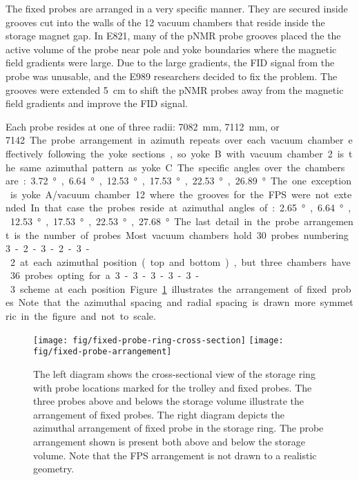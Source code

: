 The fixed probes are arranged in a very specific manner.  They are secured inside grooves cut into the walls of the 12 vacuum chambers that reside inside the storage magnet gap.  In E821, many of the pNMR probe grooves placed the the active volume of the probe near pole and yoke boundaries where the magnetic field gradients were large.  Due to the large gradients, the FID signal from the probe was unusable, and the E989 researchers decided to fix the problem.  The grooves were extended \SI{5}{\cm} to shift the pNMR probes away from the magnetic field gradients and improve the FID signal.

Each probe resides at one of three radii: \SI{7082}{\mm}, \SI{7112}{\mm}, or \SI{7142}. The probe arrangement in azimuth repeats over each vacuum chamber effectively following the yoke sections, so yoke B with vacuum chamber 2 is the same azimuthal pattern as yoke C.  The specific angles over the chambers are: \SI{3.72}{\degree}, \SI{6.64}{\degree}, \SI{12.53}{\degree}, \SI{17.53}{\degree}, \SI{22.53}{\degree}, \SI{26.89}{\degree}.  The one exception is yoke A/vacuum chamber 12 where the grooves for the FPS were not extended.  In that case the probes reside at azimuthal angles of: \SI{2.65}{\degree}, \SI{6.64}{\degree}, \SI{12.53}{\degree}, \SI{17.53}{\degree}, \SI{22.53}{\degree}, \SI{27.68}{\degree}.  The last detail in the probe arrangement is the number of probes.  Most vacuum chambers hold 30 probes numbering 3-2-3-2-3-2 at each azimuthal position (top and bottom), but three chambers have 36 probes opting for a 3-3-3-3-3-3 scheme at each position.  Figure \ref{fig:fixed-probe-arrangement} illustrates the arrangement of fixed probes.  Note that the azimuthal spacing and radial spacing is drawn more symmetric in the figure and not to scale.

\begin{figure}
\centering
\texttt{[image: fig/fixed-probe-ring-cross-section]}
\texttt{[image: fig/fixed-probe-arrangement]}
\caption{
    The left diagram shows the cross-sectional view of the storage ring with probe locations marked for the trolley and fixed probes.  The three probes above and belows the storage volume illustrate the arrangement of fixed probes.  The right diagram depicts the azimuthal arrangement of fixed probe in the storage ring. The probe arrangement shown is present both above and below the storage volume. Note that the FPS arrangement is not drawn to a realistic geometry.
    \label{fig:fixed-probe-arrangement}
}
\end{figure}

